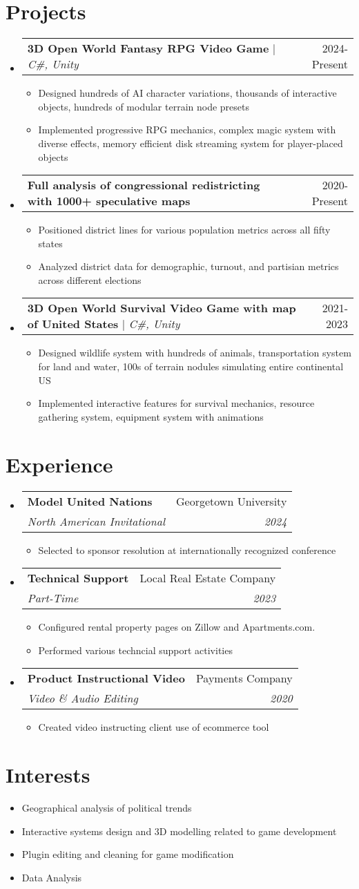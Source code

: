 \documentclass[letterpaper,11pt]{article}
\makeatletter
\newcommand{\resumeItem}[1]{ 
  \item\small{\parbox[t]{0.8\textwidth}{#1} \vspace{-2pt}} 
  }
\newcommand{\resumeItemLongLines}[1]{ 
  \item\small{\parbox[t]{0.8\textwidth}{#1} \vspace{2pt}} 
  }
\newcommand{\resumeSubheading}[4]{ 
  \vspace{-2pt}\item 
  \begin{tabular*}{0.97\textwidth}[t]{l@{\extracolsep{\fill}}r} 
    \textbf{#1} & #2 \\ 
    \textit{\small#3} & \textit{\small #4} \\ 
  \end{tabular*}\vspace{-7pt} 
}
\newcommand{\resumeProjectHeading}[2]{ 
  \item 
  \begin{tabular*}{0.97\textwidth}[t]{l@{\extracolsep{\fill}}r} 
    \small#1 & #2 \\ 
  \end{tabular*}\vspace{-7pt} 
}
\newcommand{\resumeSubHeadingListStart}{\begin{itemize}[leftmargin=0.15in, label={}]}
\newcommand{\resumeSubHeadingListEnd}{\end{itemize}}
\newcommand{\resumeItemListStart}{\begin{itemize}[leftmargin=0.15in, label={}]}
\newcommand{\resumeItemListEnd}{\end{itemize}\vspace{-5pt}}
\makeatother
\begin{document}
\section{Projects} 
  \resumeSubHeadingListStart 
    \resumeProjectHeading 
      {\textbf{3D Open World Fantasy RPG Video Game} $|$ \emph{C\#, Unity}}{2024-Present} 
      \resumeItemListStart 
        \resumeItemLongLines{Designed hundreds of AI character variations, thousands of interactive objects, hundreds of modular terrain node presets} 
        \resumeItem{Implemented progressive RPG mechanics, complex magic system with diverse effects, memory efficient disk streaming system for player-placed objects} 
      \resumeItemListEnd 
    \resumeProjectHeading 
      {\textbf{Full analysis of congressional redistricting with 1000+ speculative maps} \emph{}}{2020-Present} 
      \resumeItemListStart 
        \resumeItemLongLines{Positioned district lines for various population metrics across all fifty states} 
        \resumeItem{Analyzed district data for demographic, turnout, and partisian metrics across different elections} 
      \resumeItemListEnd 
    \resumeProjectHeading 
      {\textbf{3D Open World Survival Video Game with map of United States} $|$ \emph{C\#, Unity}}{2021-2023} 
      \resumeItemListStart 
        \resumeItemLongLines{Designed wildlife system with hundreds of animals, transportation system for land and water, 100s of terrain nodules simulating entire continental US} 
        \resumeItem{Implemented interactive features for survival mechanics, resource gathering system, equipment system with animations} 
      \resumeItemListEnd 
  \resumeSubHeadingListEnd 

\section{Experience} 
  \resumeSubHeadingListStart 
    \resumeSubheading 
      {Model United Nations}{Georgetown University} 
      {North American Invitational}{2024} 
      \resumeItemListStart 
        \resumeItem{Selected to sponsor resolution at internationally recognized conference} 
      \resumeItemListEnd 
    \resumeSubheading 
      {Technical Support}{Local Real Estate Company} 
      {Part-Time}{2023} 
      \resumeItemListStart 
        \resumeItem{Configured rental property pages on Zillow and Apartments.com. } 
        \resumeItem{Performed various techncial support activities} 
      \resumeItemListEnd 
    \resumeSubheading 
      {Product Instructional Video}{Payments Company} 
      {Video \& Audio Editing}{2020} 
      \resumeItemListStart 
        \resumeItem{Created video instructing client use of ecommerce tool} 
      \resumeItemListEnd 
  \resumeSubHeadingListEnd 

\section{Interests} 
  \resumeItemListStart 
    \resumeItem{Geographical analysis of political trends} 
    \resumeItem{Interactive systems design and 3D modelling related to game development} 
    \resumeItem{Plugin editing and cleaning for game modification} 
    \resumeItem{Data Analysis} 
  \resumeItemListEnd 
\end{document}
